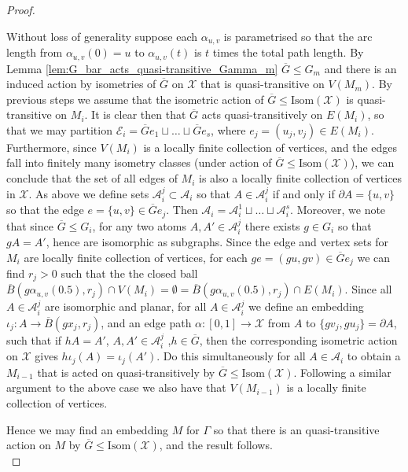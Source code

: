 \documentclass{article}
\numberwithin{equation}{section}
\theoremstyle{definition}
\theoremstyle{remark}
\begin{document}
\begin{proof}
\begin{itemize}
        Without loss of generality suppose each $\alpha_{u,v}$ is parametrised so that the arc length from $\alpha_{u,v}(0)=u$ to $\alpha_{u,v}(t)$ is $t$ times the total path length. By Lemma \ref{lem:G_bar_acts_quasi-transitive_Gamma_m} $\overline{G}\leq G_m$ and there is an induced action by isometries of $\overline{G}$ on $\mathcal{X}$ that is quasi-transitive on $V(M_m)$. By previous steps we assume that the isometric action of $\overline{G}\leq \text{Isom}(\mathcal{X})$ is quasi-transitive on $M_i$. It is clear then that $\overline{G}$ acts quasi-transitively on $E(M_i)$, so that we may partition $\mathcal{E}_i=\overline{G}e_1\sqcup \ldots \sqcup \overline{G}e_s$, where $e_j=(u_j,v_j)\in E(M_i).$
        Furthermore, since $V(M_i)$ is a locally finite collection of vertices, and the edges fall into finitely many isometry classes (under action of $\overline{G}\leq \text{Isom}(\mathcal{X})$), we can conclude that the set of all edges of $M_i$ is also a locally finite collection of vertices in $\mathcal{X}$.
        As above we define sets $\mathcal{A}_i^j\subset\mathcal{A}_i$ so that $A\in\mathcal{A}_i^j$ if and only if $\partial A=\{u,v\}$ so that the edge $e=\{u,v\}\in \overline{G}e_j$. Then $ \mathcal{A}_i=\mathcal{A}_i^1\sqcup \ldots \sqcup\mathcal{A}_i^s $. Moreover, we note that since $\overline{G}\leq G_i$, for any two atoms $A,A'\in\mathcal{A}_i^j$ there exists $g\in G_i$ so that $gA=A'$, hence are isomorphic as subgraphs.
       Since the edge and vertex sets for $M_i$ are locally finite collection of vertices, for each $ge=(gu,gv)\in \overline{G}e_j$ we can find $r_j>0$ such that the the closed ball $\overline{B}(g\alpha_{u,v}(0.5),r_j)\cap V(M_i)=\emptyset=\overline{B}(g\alpha_{u,v}(0.5),r_j)\cap E(M_i)$.
        Since all $A\in \mathcal{A}_i^j$ are isomorphic and planar, for all $A\in\mathcal{A}_i^j$ we define an embedding $\iota_j:A\rightarrow \overline{B}(gx_j,r_j)$, and an edge path $\alpha:[0,1]\rightarrow \mathcal{X}$ from $A$ to $\{gv_j,gu_j\}=\partial A$, such that if $hA=A'$, $A,A'\in\mathcal{A}_i^j$  ,$h\in\overline{G}$, then the corresponding isometric action on $\mathcal{X}$ gives $h\iota_j(A)=\iota_j(A')$.
        Do this simultaneously for all $A\in\mathcal{A}_i$ to obtain a $M_{i-1}$ that is acted on quasi-transitively by $\overline{G}\leq \text{Isom}(\mathcal{X}).$ Following a similar argument to the above case we also have that $V(M_{i-1})$ is a locally finite collection of vertices.
    \end{itemize}
    Hence we may find an embedding $M$ for $\Gamma$ so that there is an quasi-transitive action on $M$ by $\overline{G}\leq \text{Isom}(\mathcal{X})$, and the result follows.\\ 
\end{proof}
\end{document}
